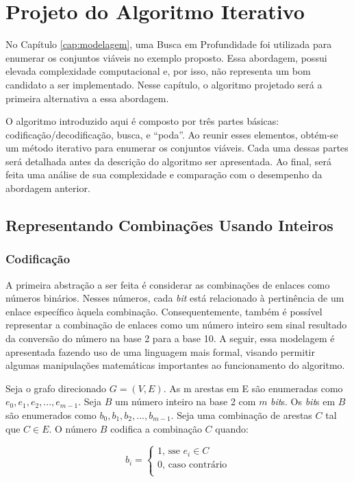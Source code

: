 \chapter{Projeto do Algoritmo Iterativo}
\label{cap:iterativo}

No Capítulo \ref{cap:modelagem}, uma Busca em Profundidade foi utilizada para enumerar os conjuntos viáveis no exemplo proposto. Essa abordagem, possui elevada complexidade computacional e, por isso, não representa um bom candidato a ser implementado. Nesse capítulo, o algoritmo projetado será a primeira alternativa a essa abordagem.

O algoritmo introduzido aqui é composto por três partes básicas: codificação/decodificação, busca, e ``poda''. Ao reunir esses elementos, obtém-se um método iterativo para enumerar os conjuntos viáveis. Cada uma dessas partes será detalhada antes da descrição do algoritmo ser apresentada. Ao final, será feita uma análise de sua complexidade e comparação com o desempenho da abordagem anterior. 

\section{Representando Combinações Usando Inteiros}
\label{section:codificacao}

\subsection{Codificação}

A primeira abstração a ser feita é considerar as combinações de enlaces como números binários. Nesses números, cada {\it bit} está relacionado à pertinência de um enlace específico àquela combinação. Consequentemente, também é possível representar a combinação de enlaces como um número inteiro sem sinal resultado da conversão do número na base 2 para a base 10. A seguir, essa modelagem é apresentada fazendo uso de uma linguagem mais formal, visando permitir algumas manipulações matemáticas importantes ao funcionamento do algoritmo.

Seja o grafo direcionado $G=(V,E)$. As m arestas em E são enumeradas como $e_0, e_1, e_2, ..., e_{m-1}$. Seja $B$ um número inteiro na base 2 com $m$ {\it bit}s. Os {\it bit}s em $B$ são enumerados como $b_0, b_1, b_2, ..., b_{m-1}$. Seja uma combinação de arestas $C$ tal que $C \in E$. O número $B$ codifica a combinação $C$ quando:

\[ b_i =
\begin{cases}
	1	\text{, sse } e_i \in C\\
	0	\text{, caso contrário}\\
  \end{cases}
\]

